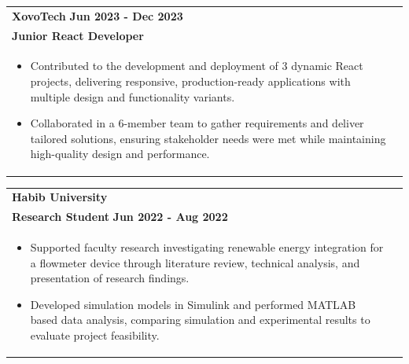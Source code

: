\documentclass[a4paper,8pt]{article}
\begin{document}
\begin{tabularx}{\linewidth}{ @{}l r@{} }
\textbf{XovoTech} \hfill \textbf{Jun 2023 - Dec 2023} \\[4pt]
\textbf{Junior React Developer}\\[4pt]
\begin{minipage}[t]{\linewidth}
    \begin{itemize}[nosep,after=\strut, leftmargin=1em, itemsep=2pt]
        \item Contributed to the development and deployment of 3 dynamic React projects, delivering responsive, production-ready applications with multiple design and functionality variants.
        \item Collaborated in a 6-member team to gather requirements and deliver tailored solutions, ensuring stakeholder needs were met while maintaining high-quality design and performance.
    \end{itemize}
\end{minipage}
\end{tabularx}

\begin{tabularx}{\linewidth}{ @{}l r@{} }
\textbf{Habib University}  \\[4pt]
\textbf{Research Student} \hfill \textbf{Jun 2022 - Aug 2022} \\[4pt]
\begin{minipage}[t]{\linewidth}
    \begin{itemize}[nosep,after=\strut, leftmargin=1em, itemsep=2pt]
        \item Supported faculty research investigating renewable energy integration for a flowmeter device through literature review, technical analysis, and presentation of research findings.
        \item Developed simulation models in Simulink and performed MATLAB based data analysis, comparing simulation and experimental results to evaluate project feasibility.
    \end{itemize}
\end{minipage}

\end{tabularx}


\end{document}
